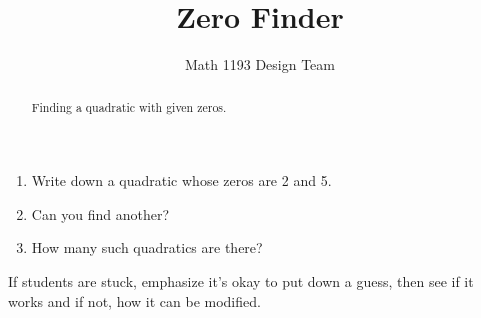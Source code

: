 \documentclass[noauthor]{ximera}
\title{Zero Finder}
\author{Math 1193 Design Team}
\begin{document}
\begin{abstract}
    Finding a quadratic with given zeros.
\end{abstract}
\maketitle

\begin{enumerate}
    \item Write down a quadratic whose zeros are 2 and 5.
    \item Can you find another?
    \item How many such quadratics are there?
\end{enumerate}

\begin{instructorNotes}
If students are stuck, emphasize it's okay to put down a guess, then
see if it works and if not, how it can be modified.
\end{instructorNotes}
\end{document}
